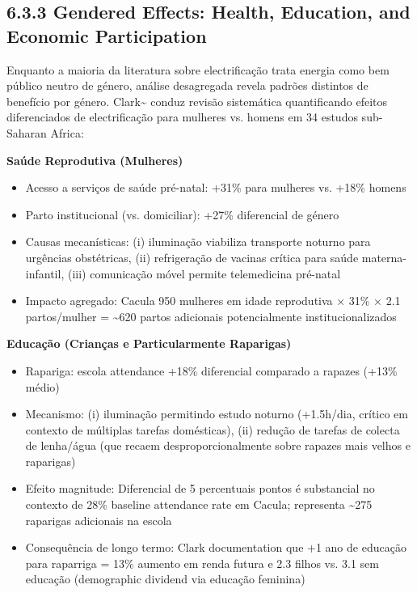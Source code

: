 \documentclass[12pt, a4paper]{article}
\begin{document}
\subsection*{6.3.3 Gendered Effects: Health, Education, and Economic Participation}

Enquanto a maioria da literatura sobre electrificação trata energia como bem público neutro de género, análise desagregada revela padrões distintos de benefício por género. Clark\textasciitilde{}\citep{Clark2021} conduz revisão sistemática quantificando efeitos diferenciados de electrificação para mulheres vs. homens em 34 estudos sub-Saharan Africa:

\textbf{Saúde Reprodutiva (Mulheres)}
\begin{itemize}
\item Acesso a serviços de saúde pré-natal: +31\% para mulheres vs. +18\% homens
\item Parto institucional (vs. domiciliar): +27\% diferencial de género
\item Causas mecanísticas: (i) iluminação viabiliza transporte noturno para urgências obstétricas, (ii) refrigeração de vacinas crítica para saúde materna-infantil, (iii) comunicação móvel permite telemedicina pré-natal
\item Impacto agregado: Cacula 950 mulheres em idade reprodutiva × 31\% × 2.1 partos/mulher = \textasciitilde{}620 partos adicionais potencialmente institucionalizados
\end{itemize}

\textbf{Educação (Crianças e Particularmente Raparigas)}
\begin{itemize}
\item Rapariga: escola attendance +18\% diferencial comparado a rapazes (+13\% médio)
\item Mecanismo: (i) iluminação permitindo estudo noturno (+1.5h/dia, crítico em contexto de múltiplas tarefas domésticas), (ii) redução de tarefas de colecta de lenha/água (que recaem desproporcionalmente sobre rapazes mais velhos e raparigas)
\item Efeito magnitude: Diferencial de 5 percentuais pontos é substancial no contexto de 28\% baseline attendance rate em Cacula; representa \textasciitilde{}275 raparigas adicionais na escola
\item Consequência de longo termo: Clark documentation que +1 ano de educação para raparriga = 13\% aumento em renda futura e 2.3 filhos vs. 3.1 sem educação (demographic dividend via educação feminina)
\end{itemize}
\end{document}
